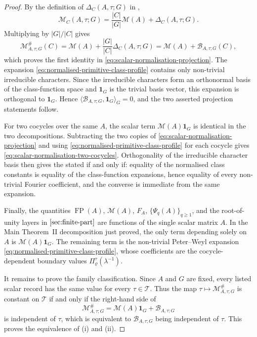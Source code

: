 \documentclass[11pt,a4paper]{amsart}
\theoremstyle{plain}
\theoremstyle{definition}
\theoremstyle{remark}
\DeclareMathOperator{\FP}{FP}
\begin{document}
\begin{proof}
  By the definition of \(\Delta_C(A,\tau;G)\) in
  ,
  \[
    \mathcal M_C(A,\tau;G)
    =
    \frac{|C|}{|G|}\mathcal M(A)+\Delta_C(A,\tau;G).
  \]
  Multiplying by \(|G|/|C|\) gives
  \[
    \mathcal M^\#_{A,\tau;G}(C)
    =
    \mathcal M(A)
    +
    \frac{|G|}{|C|}\Delta_C(A,\tau;G)
    =
    \mathcal M(A)+\mathcal B_{A,\tau;G}(C),
  \]
  which proves the first identity in
  \eqref{eq:scalar-normalisation-projection}. The expansion
  \eqref{eq:normalised-primitive-class-profile} contains only
  non-trivial irreducible characters. Since the irreducible characters
  form an orthonormal basis of the class-function space and
  \(\mathbf 1_G\) is the trivial basis vector, this expansion is
  orthogonal to \(\mathbf 1_G\). Hence
  \(\langle \mathcal B_{A,\tau;G},\mathbf 1_G\rangle_G=0\), and the two
  asserted projection statements follow.

  For two cocycles over the same \(A\), the scalar term
  \(\mathcal M(A)\mathbf 1_G\) is identical in the two decompositions.
  Subtracting the two copies of
  \eqref{eq:scalar-normalisation-projection} and using
  \eqref{eq:normalised-primitive-class-profile} for each cocycle gives
  \eqref{eq:scalar-normalisation-two-cocycles}. Orthogonality of the
  irreducible character basis then gives the stated if and only if:
  equality of the normalised class constants is equality of the
  class-function expansions, hence equality of every non-trivial Fourier
  coefficient, and the converse is immediate from the same expansion.

  Finally, the quantities
  \(\FP(A)\), \(\mathcal M(A)\), \(F_A\), \(\{\Psi_q(A)\}_{q\ge1}\), and
  the root-of-unity layers in \(\Cref{sec:finite-part}\) are functions of
  the single scalar matrix \(A\). In the Main Theorem~II decomposition
  just proved, the only term depending solely on \(A\) is
  \(\mathcal M(A)\mathbf 1_G\). The remaining term is the non-trivial
  Peter--Weyl expansion
  \eqref{eq:normalised-primitive-class-profile}, whose coefficients are
  the cocycle-dependent boundary values
  \(\Pi_\varrho^\tau(\lambda^{-1})\).

  It remains to prove the family classification. Since \(A\) and \(G\)
  are fixed, every listed scalar record has the same value for every
  \(\tau\in\mathscr T\). Thus the map
  \(\tau\mapsto\mathcal M^\#_{A,\tau;G}\) is constant on
  \(\mathscr T\) if and only if the right-hand side of
  \[
    \mathcal M^\#_{A,\tau;G}
    =
    \mathcal M(A)\mathbf 1_G+\mathcal B_{A,\tau;G}
  \]
  is independent of \(\tau\), which is equivalent to
  \(\mathcal B_{A,\tau;G}\) being independent of \(\tau\). This proves
  the equivalence of \textup{(i)} and \textup{(ii)}.


\end{proof}
\end{document}
